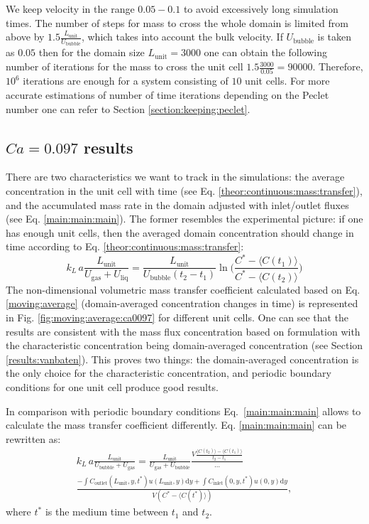 \documentclass{article}
\newcommand{\beq}{\begin{equation}}
\newcommand{\feq}{\end{equation}}
\newcommand{\vol}{k_L\,a}
\newcommand{\lunit}{L_{\mathrm{unit}}}
\newcommand{\ububble}{U_{\mathrm{bubble}}}
\newcommand{\uliq}{U_{\mathrm{liq}}}
\newcommand{\ugas}{U_{\mathrm{gas}}}
\newcommand{\cinlet}{C_{\mathrm{inlet}}}
\newcommand{\coutlet}{C_{\mathrm{outlet}}}
\newcommand{\cstar}{C^{*}}
\newcommand{\volnondim}{\vol \frac{\lunit}{\ububble+\ugas}}
\begin{document}
We keep velocity in the range $0.05-0.1$ to avoid excessively long simulation times.
The number of steps for mass to cross the whole domain is
limited from above by $1.5 \frac{\lunit}{\ububble}$, which takes into account the bulk
velocity. If $\ububble$ is taken as $0.05$ then for
the domain size $\lunit=3000$ one can obtain the following number of iterations for the mass to
cross the unit cell $1.5 \frac{3000}{0.05}=90000$. Therefore, $10^{6}$ iterations are enough
for a system consisting of $10$ unit cells. For more accurate estimations of number of time
iterations depending on the Peclet number one can refer to Section \ref{section:keeping:peclet}.

\subsection{$Ca=0.097$ results}
There are two characteristics we want to track in the simulations: the average
concentration in
the unit cell with time (see Eq. \ref{theor:continuous:mass:transfer}), and the accumulated mass
rate in the domain adjusted with inlet/outlet fluxes (see Eq. \ref{main:main:main}). The former
resembles the experimental picture: if one has enough unit cells, then the averaged domain
concentration should change in time according to Eq. \ref{theor:continuous:mass:transfer}: 
\beq
\label{moving:average}
\vol\frac{\lunit}{\ugas+\uliq}=\frac{\lunit}{\ububble (t_2
-t_1)}\ln\biggl(\frac{C^*-\langle C(t_1) \rangle}{C^*-\langle C(t_2)\rangle}\biggr)
\feq
The non-dimensional volumetric mass transfer coefficient calculated based on Eq.
\ref{moving:average} (domain-averaged concentration changes in time) is
represented in Fig. \ref{fig:moving:average:ca0097} for different unit cells. One can see that the
results are consistent with the mass flux
concentration based on \citeauthor{vanbaten-circular} formulation with the characteristic
concentration being domain-averaged concentration (see Section
\ref{results:vanbaten}). This proves two things:  the domain-averaged
concentration is the only choice for the characteristic concentration, and
periodic boundary conditions for one unit cell produce good results.

In comparison with periodic boundary conditions Eq.~\ref{main:main:main} allows
to calculate the mass transfer coefficient differently. Eq.
\ref{main:main:main}  can be rewritten as: \beq
\label{main:main:main:thorough}
\begin{aligned}
\volnondim=\frac{\lunit}{\ugas+\ububble} \frac{V \frac{\langle C(t_2)\rangle - \langle C(t_1)
\rangle}{t_2-t_1}}{\dots}\\
\frac{-\int{\coutlet(\lunit,y,t^*) u(\lunit,y) \mathrm{d} y}+\int{\cinlet(0,y,t^*)
u(0,y)\mathrm{d} y}}{V (\cstar - \langle C(t^*) \rangle)},
\end{aligned}
\feq
where $t^*$ is the medium time between $t_1$ and $t_2$.
\end{document}
